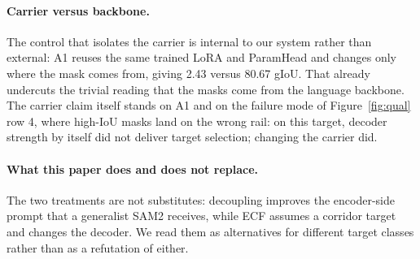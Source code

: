\paragraph{Carrier versus backbone.}
The control that isolates the carrier is internal to our system rather than external: A1 reuses the same trained LoRA and ParamHead and changes only where the mask comes from, giving 2.43 versus 80.67 gIoU.
That already undercuts the trivial reading that the masks come from the language backbone.
The carrier claim itself stands on A1 and on the failure mode of Figure~\ref{fig:qual} row 4, where high-IoU masks land on the wrong rail: on this target, decoder strength by itself did not deliver target selection; changing the carrier did.

\paragraph{What this paper does and does not replace.}
The two treatments are not substitutes: decoupling improves the encoder-side prompt that a generalist SAM2 receives, while ECF assumes a corridor target and changes the decoder.
We read them as alternatives for different target classes rather than as a refutation of either.

